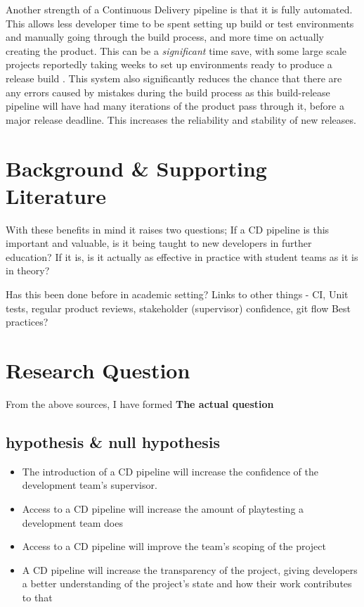\documentclass[lettersize,journal]{IEEEtran}
\begin{document}
        Another strength of a Continuous Delivery pipeline is that it is fully automated. This allows less developer time to be spent setting up build or test environments and manually going through the build process, and more time on actually creating the product. This can be a \textit{significant} time save, with some large scale projects reportedly taking weeks to set up environments ready to produce a release build \cite{paddy, ContDelIntro}. This system also significantly reduces the chance that there are any errors caused by mistakes during the build process as this build-release pipeline will have had many iterations of the product pass through it, before a major release deadline. This increases the reliability and stability of new releases. \\

    
\section{Background \& Supporting Literature}
    With these benefits in mind it raises two questions; If a CD pipeline is this important and valuable, is it being taught to new developers in further education? If it is, is it actually as effective in practice with student teams as it is in theory?

    Has this been done before in academic setting\cite{CDCourse2014,CDMobileDev,Tornado,IndustryAcademyDenmark}? 
    Links to other things - CI\cite{CICDCD}, Unit tests, regular product reviews, stakeholder (supervisor) confidence, git flow \cite{gitBranching}
    Best practices\cite{duvall2007continuous}? 

\section{Research Question}
    From the above sources, I have formed \textbf{The actual question}
    \subsection{hypothesis \& null hypothesis}
        \begin{itemize}
            \item The introduction of a CD pipeline will increase the confidence of the development team's supervisor.
            \item Access to a CD pipeline will increase the amount of playtesting a development team does
            \item Access to a CD pipeline will improve the team's scoping of the project
            \item A CD pipeline will increase the transparency of the project, giving developers a better understanding of the project's state and how their work contributes to that
        \end{itemize}
\end{document}
